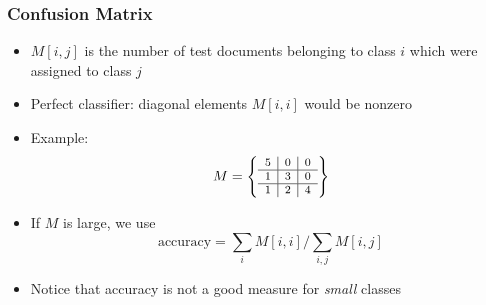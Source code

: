 \documentclass[svgnames]{beamer}
\begin{document}

\begin{frame} \frametitle{Confusion Matrix}
  
 \begin{itemize}
 \item $M[i,j]$ is the number of test documents belonging to class $i$ which
     were assigned to class $j$
 \item Perfect classifier: diagonal elements $M[i,i]$ would be nonzero
 \item Example:
     \begin{displaymath}
         \footnotesize
         M = \left\{
             \begin{array}{c|c|c}
               5 & 0 & 0 \\\hline
               1 & 3 & 0 \\\hline
               1 & 2 & 4
             \end{array}
         \right\}
     \end{displaymath}
 \item If $M$ is large, we use
     \begin{displaymath}
         \text{accuracy} = \sum_i M[i,i] / \sum_{i,j} M[i,j]
     \end{displaymath}
 \item Notice that accuracy is not a good measure for {\it small} classes
 \end{itemize}

\end{frame}


  
\end{document}
